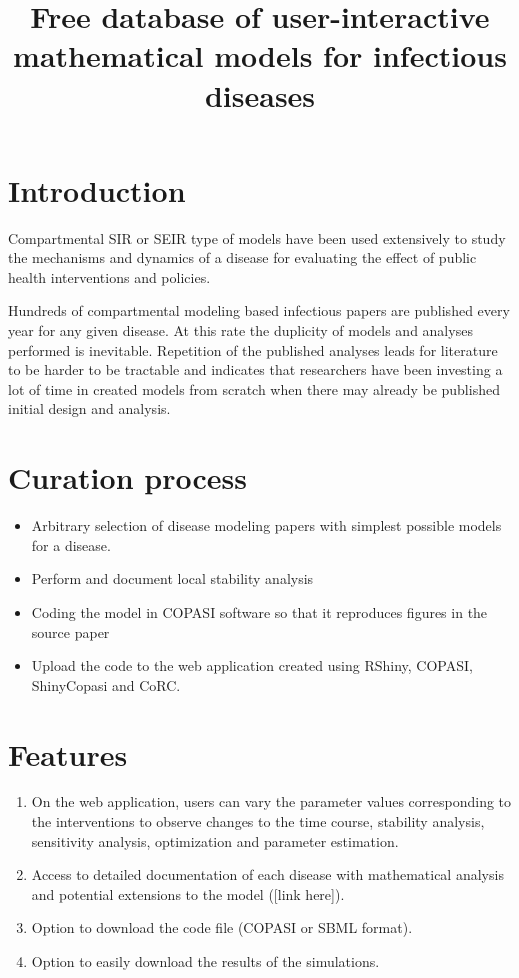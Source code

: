 \documentclass{article}
\title{Free database of user-interactive mathematical models for infectious diseases}
\author{}
\date{}
\begin{document}
\maketitle

\section{Introduction}
Compartmental SIR or SEIR type of models have been used extensively to study the mechanisms and dynamics of a disease for evaluating the effect of public health interventions and policies. 

Hundreds of compartmental modeling based infectious papers are published every year for any given disease. At this rate the duplicity of models and analyses performed is inevitable. Repetition of the published analyses leads for literature to be harder to be tractable and indicates that researchers have been investing a lot of time in created models from scratch when there may already be published initial design and analysis.



\section{Curation process}
\begin{itemize}
    \item Arbitrary selection of disease modeling papers with simplest possible models for a disease.
    \item Perform and document local stability analysis
    \item Coding the model in COPASI software so that it reproduces figures in the source paper
    \item Upload the code to the web application created using RShiny, COPASI, ShinyCopasi and CoRC.
\end{itemize}


\section{Features}
\begin{enumerate}
    \item On the web application, users can vary the parameter values corresponding to the interventions to observe changes to the time course, stability analysis, sensitivity analysis, optimization and parameter estimation.
    \item Access to detailed documentation of each disease with mathematical analysis and potential extensions to the model ([link here]).
    \item Option to download the code file (COPASI or SBML format).
    \item Option to easily download the results of the simulations.
\end{enumerate}
\end{document}
